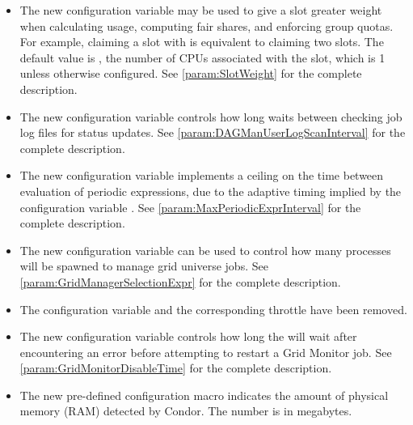\begin{itemize}

\item The new configuration variable  may be used to
give a slot greater weight when calculating usage, computing fair
shares, and enforcing group quotas.  For example, claiming a slot with
 is equivalent to claiming two  slots.  The default value is , the number of CPUs
associated with the slot, which is 1 unless otherwise configured.
See \ref{param:SlotWeight} for the complete description.


\item The new configuration variable 
controls how long  waits between checking job log files
for status updates.
See \ref{param:DAGManUserLogScanInterval} for the complete description.

\item The new configuration variable 
  implements a ceiling on the time between evaluation of periodic expressions,
  due to the adaptive timing implied by the configuration variable
  .
  See \ref{param:MaxPeriodicExprInterval} for the complete description.

\item The new configuration variable 
can be used to control how many  processes will be
spawned to manage grid universe jobs. 
See \ref{param:GridManagerSelectionExpr} for the complete description.

\item The configuration variable
 and the
corresponding throttle 
have been removed.

\item The new configuration variable 
controls how long the  will wait after encountering
an error before attempting to restart a Grid Monitor job.
See \ref{param:GridMonitorDisableTime} for the complete description.

\item The new pre-defined configuration macro 
indicates the amount of physical memory (RAM) detected by Condor.
The number is in megabytes.


\end{itemize}
